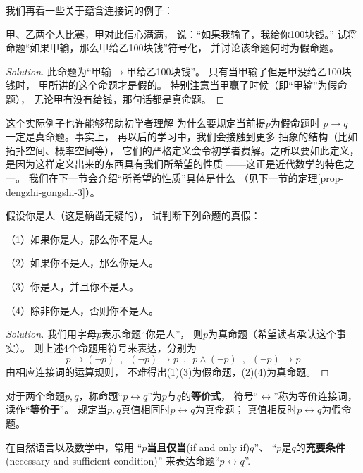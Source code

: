 我们再看一些关于蕴含连接词的例子：

\begin{example}
甲、乙两个人比赛，甲对此信心满满，
说：“如果我输了，我给你100块钱。”
试将命题“如果甲输，那么甲给乙100块钱”符号化，
并讨论该命题何时为假命题。
\end{example}

\begin{proof}[Solution]
此命题为“甲输$\rightarrow$甲给乙100块钱”。
只有当甲输了但是甲没给乙100块钱时，
甲所讲的这个命题才是假的。
特别注意当甲赢了时候（即“甲输”为假命题），
无论甲有没有给钱，那句话都是真命题。
\end{proof}

这个实际例子也许能够帮助初学者理解
为什么要规定当前提$p$为假命题时
$p\rightarrow q$ 一定是真命题。事实上，
再以后的学习中，我们会接触到更多
抽象的结构（比如拓扑空间、概率空间等），
它们的严格定义会令初学者费解。之所以要如此定义，
是因为这样定义出来的东西具有我们所希望的性质
——这正是近代数学的特色之一。
我们在下一节会介绍“所希望的性质”具体是什么
（见下一节的定理\ref{prop-dengzhi-gongshi-3}）。
\begin{example}假设你是人（这是确凿无疑的），
试判断下列命题的真假：

（1）如果你是人，那么你不是人。

（2）如果你不是人，那么你是人。

（3）你是人，并且你不是人。

（4）除非你是人，否则你不是人。
\end{example}

\begin{proof}[Solution]
我们用字母$p$表示命题“你是人”，
则$p$为真命题（希望读者承认这个事实）。
则上述4个命题用符号来表达，分别为
$$p\rightarrow (\neg p)\,\,\,,\,\,\,
(\neg p)\rightarrow p\,\,\,,\,\,\,
p\wedge(\neg p)\,\,\,,\,\,\,
(\neg p)\rightarrow p$$
由相应连接词的运算规则，
不难得出(1)(3)为假命题，(2)(4)为真命题。
\end{proof}

\begin{definition}[等价连接词]
对于两个命题$p,q$，称命题“$p\leftrightarrow q$”为$p$与$q$的\textbf{等价式}，
符号“$\leftrightarrow$”称为等价连接词，读作“\textbf{等价于}”。
规定当$p,q$真值相同时$p\leftrightarrow q$为真命题；
真值相反时$p\leftrightarrow q$为假命题。
\end{definition}
在自然语言以及数学中，常用
“$p$\textbf{当且仅当}(if and only if)$q$”、
“$p$是$q$的\textbf{充要条件}(necessary and sufficient condition)”
来表达命题“$p\leftrightarrow q$”.
\vsp

